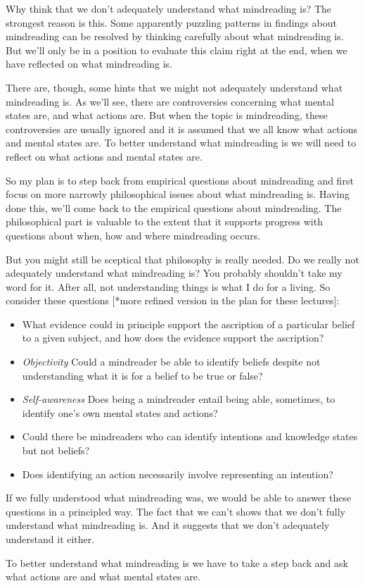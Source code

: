 \documentclass[12pt,\papersize]{extarticle}
\begin{document}
Why think that we don't adequately understand what mindreading is? 
The strongest reason is this.
Some apparently puzzling patterns in findings about mindreading can be resolved by thinking carefully about what mindreading is. 
But we'll only be in a position to evaluate this claim right at the end, when we have reflected on what mindreading is.

There are, though, some hints that we might not adequately understand what mindreading is.
As we'll see, there are controversies concerning what mental states are, and what actions are.  
But when the topic is mindreading, these controversies are usually ignored and it is assumed that we all know what actions and mental states are. 
To better understand what mindreading is we will need to reflect on what actions and mental states are.

So my plan is to step back from empirical questions about mindreading and first focus on more narrowly philosophical issues about what mindreading is.
Having done this, we'll come back to the empirical questions about mindreading.  
The philosophical part is valuable to the extent that it supports progress with questions about when, how and where mindreading occurs.

But you might still be sceptical that philosophy is really needed.  Do we really not adequately understand what mindreading is?
You probably shouldn't take my word for it.
After all, not understanding things is what I do for a living.
So consider these questions 
[*more refined version in the plan for these lectures]:
\begin{itemize}
%
\item What evidence could in principle support the ascription of a particular belief to a given subject, and how does the evidence support the ascription?
%
\item \emph{Objectivity} Could a mindreader be able to identify beliefs despite not  understanding what it is for a belief to be true or false? 
%
\item \emph{Self-awareness}  Does being a mindreader entail being able, sometimes, to identify one's own mental states and actions? 
%
\item Could there be mindreaders who can identify intentions and knowledge states but not beliefs?
%
\item Does identifying an action necessarily involve representing an intention?
%
\end{itemize}
If we fully understood what mindreading was, we would be able to answer these questions in a principled way.
The fact that we can't shows that we don't fully understand what mindreading is.
And it suggests that we don't adequately understand it either.

To better understand what mindreading is we have to take a step back and ask what actions are and what mental states are.






\small

\end{document}
